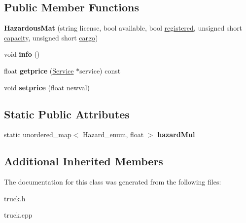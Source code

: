 \subsection*{Public Member Functions}
\begin{DoxyCompactItemize}
\item 
\mbox{\label{class_hazardous_mat_adff1b06ba4631c6b3f77168e4b792b1f}} 
{\bfseries Hazardous\+Mat} (string license, bool available, bool \hyperlink{class_truck_a80b8405cf7a15b236fef70116f99c4fb}{registered}, unsigned short \hyperlink{class_truck_a14541fad6d47c606ce4e1bd150a68a23}{capacity}, unsigned short \hyperlink{class_truck_a968fc6b1a6171a03e4254d6615da4ecd}{cargo})
\item 
\mbox{\label{class_hazardous_mat_ab07463da3e9a5d3b8933d2b01332ed00}} 
void {\bfseries info} ()
\item 
\mbox{\label{class_hazardous_mat_a73278c12e87de90d34a59be50129c714}} 
float {\bfseries getprice} (\hyperlink{class_service}{Service} $\ast$service) const
\item 
\mbox{\label{class_hazardous_mat_ad4b608a3cf000d1c13f01d8d34f1d6fc}} 
void {\bfseries setprice} (float newval)
\end{DoxyCompactItemize}
\subsection*{Static Public Attributes}
\begin{DoxyCompactItemize}
\item 
\mbox{\label{class_hazardous_mat_a0d695364bed729ddeca5851314281ad2}} 
static unordered\+\_\+map$<$ Hazard\+\_\+enum, float $>$ {\bfseries hazard\+Mul}
\end{DoxyCompactItemize}
\subsection*{Additional Inherited Members}


The documentation for this class was generated from the following files\+:\begin{DoxyCompactItemize}
\item 
truck.\+h\item 
truck.\+cpp\end{DoxyCompactItemize}
